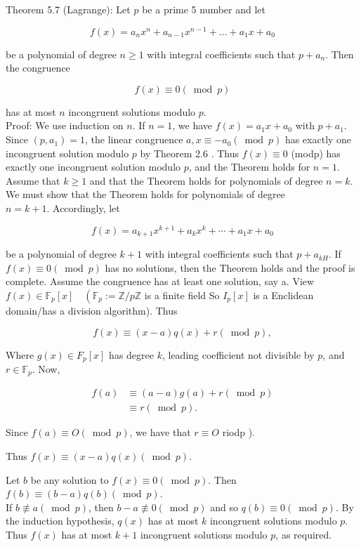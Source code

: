 \documentclass[10pt]{article}
\begin{document}
Theorem 5.7 (Lagrange): Let $p$ be a prime 5 number and let

$$
f(x)=a_{n} x^{n}+a_{n-1} x^{n-1}+\ldots+a_{1} x+a_{0}
$$

be a polynomial of degree $n \geqslant 1$ with integral coefficients such that $p+a_{n}$. Then the congruence

$$
f(x) \equiv 0(\bmod p)
$$

has at most $n$ incongruent solutions modulo $p$.\\
Proof: We use induction on $n$. If $n=1$, we have $f(x)=a_{1} x+a_{0}$ with $p+a_{1}$. Since $\left(p, a_{1}\right)=1$, the linear congruence $a, x \equiv-a_{0}(\bmod p)$ has exactly one incongruent solution modulo $p$ by Theorem 2.6 . Thus $f(x) \equiv 0$ (modp) has exactly one incongruent solution modulo $p$, and the Theorem holds for $n=1$.\\
Assume that $k \geqslant 1$ and that the Theorem holds for polynomials of degree $n=k$. We must show that the Theorem holds for polynomials of degree\\
$n=k+1$. Accordingly, let

$$
f(x)=a_{k+1} x^{k+1}+a_{k} x^{k}+\cdots+a_{1} x+a_{0}
$$

be a polynomial of degree $k+1$ with integral coefficients such that $p+a_{k H}$. If $f(x) \equiv 0(\bmod p)$ has no solutions, then the Theorem holds and the proof is complete. Assume the congruence has at least one solution, say a. View $f(x) \in \mathbb{F}_{p}[x] \quad\left(\mathbb{F}_{p}:=\mathbb{Z} / p \mathbb{Z}\right.$ is a finite field So $I_{p}[x]$ is a Enclidean domain/has a division algorithm). Thus

$$
f(x) \equiv(x-a) q(x)+r(\bmod p),
$$

Where $g(x) \in F_{p}[x]$ has degree $k$, leading coefficient not divisible by $p$, and $r \in \mathbb{F}_{p}$. Now,

$$
\begin{aligned}
f(a) & \equiv(a-a) g(a)+r(\bmod p) \\
& \equiv r(\bmod p) .
\end{aligned}
$$

Since $f(a) \equiv O(\bmod p)$, we have that $r \equiv O$ riodp ).

Thus $f(x) \equiv(x-a) q(x)(\bmod p)$.

Let $b$ be any solution to $f(x) \equiv 0(\bmod p)$. Then $f(b) \equiv(b-a) q(b)(\bmod p)$.\\
If $b \not \equiv a(\bmod p)$, then $b-a \not \equiv 0(\bmod p)$ and so $q(b) \equiv 0(\bmod p)$. By the induction hypothesis, $q(x)$ has at most $k$ incongruent solutions modulo $p$. Thus $f(x)$ has at most $k+1$ incongruent solutions modulo $p$, as required.
\end{document}
